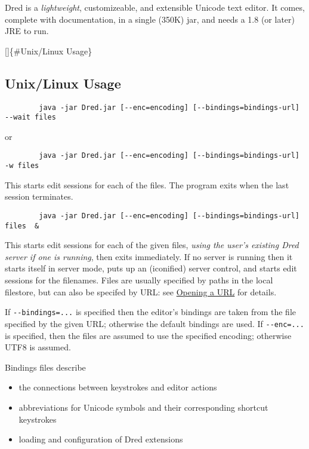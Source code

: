 \documentclass[
]{article}
\providecommand{\tightlist}{%
  \setlength{\itemsep}{0pt}\setlength{\parskip}{0pt}}
\begin{document}
Dred is a \emph{lightweight}, customizeable, and extensible Unicode text
editor. It comes, complete with documentation, in a single (350K) jar,
and needs a 1.8 (or later) JRE to run.

{[}{]}\{\#Unix/Linux Usage\}

\hypertarget{unixlinux-usage}{%
\subsection{Unix/Linux Usage}\label{unixlinux-usage}}

\begin{verbatim}
        java -jar Dred.jar [--enc=encoding] [--bindings=bindings-url] --wait files 
\end{verbatim}

or

\begin{verbatim}
        java -jar Dred.jar [--enc=encoding] [--bindings=bindings-url] -w files 
\end{verbatim}

This starts edit sessions for each of the files. The program exits when
the last session terminates.

\begin{verbatim}
        java -jar Dred.jar [--enc=encoding] [--bindings=bindings-url] files  &
\end{verbatim}

This starts edit sessions for each of the given files, \emph{using the
user's existing Dred server if one is running}, then exits immediately.
If no server is running then it starts itself in server mode, puts up an
(iconified) server control, and starts edit sessions for the filenames.
Files are usually specified by paths in the local filestore, but can
also be specifed by URL: see
\protect\hyperlink{Openingux5cux2520aux5cux2520URL}{Opening a URL} for
details.

If \texttt{-\/-bindings=...} is specified then the editor's bindings are
taken from the file specified by the given URL; otherwise the default
bindings are used. If \texttt{-\/-enc=...} is specified, then the files
are assumed to use the specified encoding; otherwise UTF8 is assumed.

Bindings files describe

\begin{itemize}
\tightlist
\item
  the connections between keystrokes and editor actions
\item
  abbreviations for Unicode symbols and their corresponding shortcut
  keystrokes
\item
  loading and configuration of Dred extensions
\end{itemize}
\end{document}
